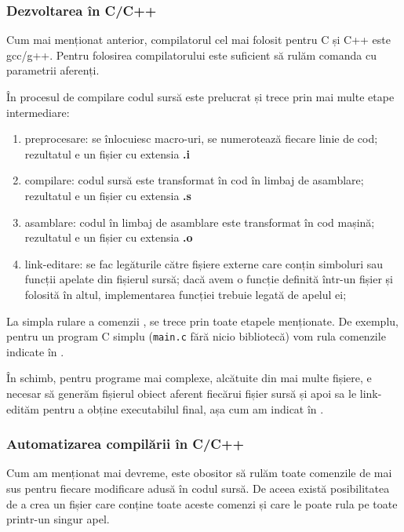 \subsubsection{Dezvoltarea în C/C++}
\label{sec:appdev:dev-env:c-dev}

Cum mai menționat anterior, compilatorul cel mai folosit pentru C și C++ este
gcc/g++. Pentru folosirea compilatorului este suficient să rulăm comanda
 cu parametrii aferenți.

În procesul de compilare codul sursă este prelucrat și trece prin mai multe
etape intermediare:

\begin{enumerate}
	\item preprocesare: se înlocuiesc macro-uri, se numerotează fiecare
		linie de cod; rezultatul e un fișier cu extensia \textbf{.i}
	\item compilare: codul sursă este transformat în cod în limbaj de
		asamblare; rezultatul e un fișier cu extensia \textbf{.s}
	\item asamblare: codul în limbaj de asamblare este transformat în cod
		mașină; rezultatul e un fișier cu extensia \textbf{.o}
	\item link-editare: se fac legăturile către fișiere externe care conțin
		simboluri sau funcții apelate din fișierul sursă; dacă avem o
		funcție definită într-un fișier și folosită în altul,
		implementarea funcției trebuie legată de apelul ei;
\end{enumerate}

La simpla rulare a comenzii , se trece prin toate etapele menționate.
De exemplu, pentru un program C simplu (\texttt{main.c} fără nicio bibliotecă) vom rula comenzile indicate în .

În schimb, pentru programe mai complexe, alcătuite din mai multe fișiere, e
necesar să generăm fișierul obiect aferent fiecărui fișier sursă și apoi sa le
link-edităm pentru a obține executabilul final, așa cum am indicat în .

\subsubsection{Automatizarea compilării în C/C++}
\label{sec:appdev:dev-env:c-dev}

Cum am menționat mai devreme, este obositor să rulăm toate comenzile de mai sus
pentru fiecare modificare adusă în codul sursă. De aceea există posibilitatea de
a crea un fișier care conține toate aceste comenzi și care le poate rula pe
toate printr-un singur apel.

